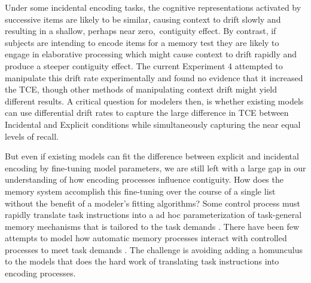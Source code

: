 \documentclass[man,natbib,floatsintext]{apa6} %
\begin{document}
Under some incidental encoding tasks, the cognitive representations activated by successive items are likely to be similar, causing context to drift slowly and resulting in a shallow\color{red}, perhaps near zero,\color{black}~contiguity effect. By contrast, if subjects are intending to encode items for a memory test they are likely to engage in elaborative processing which might cause context to drift rapidly and produce a steeper contiguity effect. The current Experiment 4 attempted to manipulate this drift rate experimentally and found no evidence that it increased the TCE, though other methods of manipulating context drift \citep[e.g.,][]{PolyEtal12} might yield different results. A critical question for modelers then, is whether existing models can use differential drift rates to capture the large difference in TCE between Incidental and Explicit conditions while simultaneously capturing the near equal levels of recall.

But even if existing models can fit the difference between explicit and incidental encoding by fine-tuning model parameters, we are still left with a large gap in our understanding of how encoding processes influence contiguity. How does the memory system accomplish this fine-tuning over the course of a single list without the benefit of a modeler's fitting algorithms? Some control process must rapidly translate task instructions into a ad hoc parameterization of task-general memory mechanisms that is tailored to the task demands \cite{HealEtal14,AtkiShif68}. There have been few attempts to model how automatic memory processes interact with controlled processes to meet task demands \citep{LehmMalm13,PolyEtal09}. The challenge is avoiding adding a homunculus to the models that does the hard work of translating task instructions into encoding processes.
\end{document}
